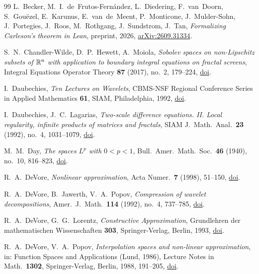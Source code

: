 \begin{thebibliography}{99}
L.~Becker, M.~I.~de~Frutos-Fern\'andez, L.~Diedering, F.~van~Doorn, S.~Gou\"ezel,
E.~Karunus, E.~van~de~Meent, P.~Monticone, J.~Mulder-Sohn, J.~Portegies, J.~Roos,
M.~Rothgang, J.~Sundstrom, J.~Tan,
\emph{Formalizing Carleson's theorem in Lean}, preprint, 2026,
\href{https://arxiv.org/abs/2609.31334}{arXiv:2609.31334}.

S.~N.~Chandler-Wilde, D.~P.~Hewett, A.~Moiola,
\emph{Sobolev spaces on non-Lipschitz subsets of $\mathbb{R}^n$ with application to boundary integral
equations on fractal screens},
Integral Equations Operator Theory \textbf{87} (2017), no.~2, 179--224,
\href{https://doi.org/10.1007/s00020-017-2342-5}{doi}.

I.~Daubechies,
\emph{Ten Lectures on Wavelets},
CBMS-NSF Regional Conference Series in Applied Mathematics \textbf{61}, SIAM, Philadelphia,
1992,
\href{https://doi.org/10.1137/1.9781611970104}{doi}.

I.~Daubechies, J.~C.~Lagarias,
\emph{Two-scale difference equations. II. Local regularity, infinite products of matrices and
fractals},
SIAM J.\ Math.\ Anal.\ \textbf{23} (1992), no.~4, 1031--1079,
\href{https://doi.org/10.1137/0523059}{doi}.

M.~M.~Day,
\emph{The spaces $L^p$ with $0 < p < 1$},
Bull.\ Amer.\ Math.\ Soc.\ \textbf{46} (1940), no.~10, 816--823,
\href{https://doi.org/10.1090/S0002-9904-1940-07308-2}{doi}.

R.~A.~DeVore,
\emph{Nonlinear approximation},
Acta Numer.\ \textbf{7} (1998), 51--150,
\href{https://doi.org/10.1017/S0962492900002816}{doi}.

R.~A.~DeVore, B.~Jawerth, V.~A.~Popov,
\emph{Compression of wavelet decompositions},
Amer.\ J.\ Math.\ \textbf{114} (1992), no.~4, 737--785,
\href{https://doi.org/10.2307/2374796}{doi}.

R.~A.~DeVore, G.~G.~Lorentz,
\emph{Constructive Approximation},
Grundlehren der mathematischen Wissenschaften \textbf{303}, Springer-Verlag, Berlin, 1993,
\href{https://doi.org/10.1007/978-3-662-02888-9}{doi}.

R.~A.~DeVore, V.~A.~Popov,
\emph{Interpolation spaces and non-linear approximation},
in: Function Spaces and Applications (Lund, 1986), Lecture Notes in Math.\ \textbf{1302},
Springer-Verlag, Berlin, 1988, 191--205,
\href{https://doi.org/10.1007/BFb0078875}{doi}.


\end{thebibliography}
